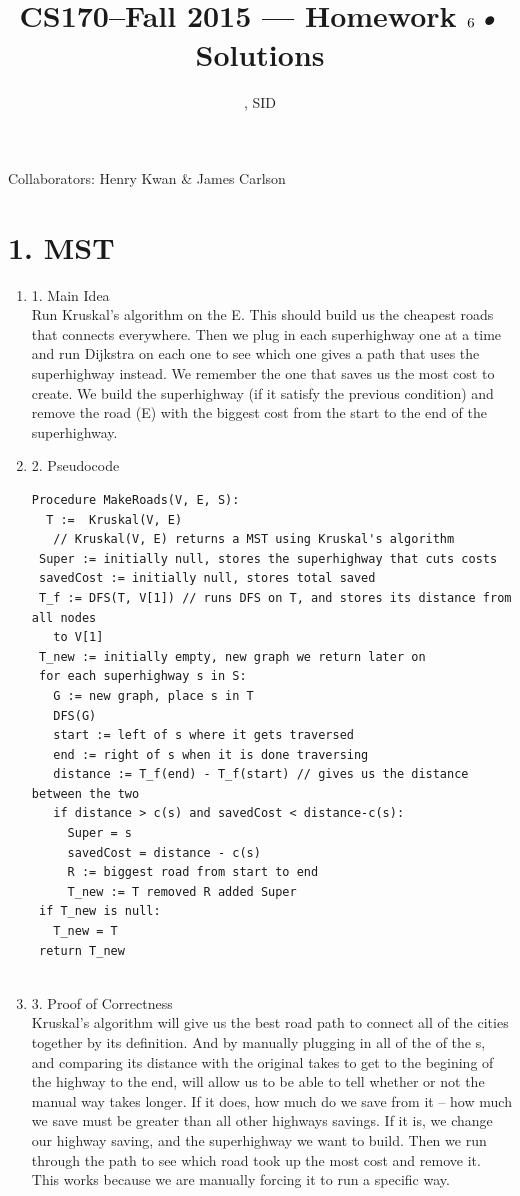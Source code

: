 \documentclass[11pt]{article}
\title{CS170--Fall 2015 --- Homework $6$\textsl{•} Solutions}
\author{\Name, SID \SID}
\date{}
\newenvironment{qparts}{\begin{enumerate}[{(}a{)}]}{\end{enumerate}}
\begin{document}
\maketitle

Collaborators: Henry Kwan \& James Carlson

\section*{1. MST}
\begin{qparts}
\item[1.] Main Idea \\
Run Kruskal's algorithm on the E. This should build us the cheapest roads that connects everywhere. Then we plug in each superhighway one at a time and run Dijkstra on each one to see which one gives a path that uses the superhighway instead. We remember the one that saves us the most cost to create. We build the superhighway (if it satisfy the previous condition) and remove the road (E) with the biggest cost from the start to the end of the superhighway. 
\item[2.] Pseudocode
\begin{verbatim}
Procedure MakeRoads(V, E, S):
  T :=  Kruskal(V, E)
   // Kruskal(V, E) returns a MST using Kruskal's algorithm
 Super := initially null, stores the superhighway that cuts costs
 savedCost := initially null, stores total saved
 T_f := DFS(T, V[1]) // runs DFS on T, and stores its distance from all nodes
   to V[1]
 T_new := initially empty, new graph we return later on
 for each superhighway s in S:
   G := new graph, place s in T
   DFS(G)
   start := left of s where it gets traversed
   end := right of s when it is done traversing   
   distance := T_f(end) - T_f(start) // gives us the distance between the two
   if distance > c(s) and savedCost < distance-c(s):
     Super = s
     savedCost = distance - c(s)
     R := biggest road from start to end
     T_new := T removed R added Super
 if T_new is null:
   T_new = T
 return T_new
  
\end{verbatim}
\item[3.] Proof of Correctness \\
Kruskal's algorithm will give us the best road path to connect all of the cities together by its definition. And by manually plugging in all of the of the s, and comparing its distance with the original takes to get to the begining of the highway to the end, will allow us to be able to tell whether or not the manual way takes longer. If it does, how much do we save from it -- how much we save must be greater than all other highways savings. If it is, we change our highway saving, and the superhighway we want to build. Then we run through the path to see which road took up the most cost and remove it. This works because we are manually forcing it to run a specific way. 
 

\end{qparts}
\end{document}
